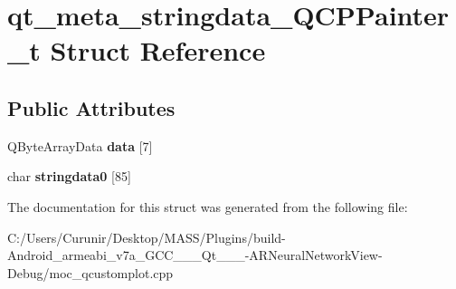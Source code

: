 \hypertarget{structqt__meta__stringdata___q_c_p_painter__t}{}\section{qt\+\_\+meta\+\_\+stringdata\+\_\+\+Q\+C\+P\+Painter\+\_\+t Struct Reference}
\label{structqt__meta__stringdata___q_c_p_painter__t}
\subsection*{Public Attributes}
\begin{DoxyCompactItemize}
\item 
\mbox{\label{structqt__meta__stringdata___q_c_p_painter__t_ac7af80f452433712c3aec1462ac4c4f7}} 
Q\+Byte\+Array\+Data {\bfseries data} \mbox{[}7\mbox{]}
\item 
\mbox{\label{structqt__meta__stringdata___q_c_p_painter__t_aacbbd6a0cc866ba22ba9aa5a89dc1507}} 
char {\bfseries stringdata0} \mbox{[}85\mbox{]}
\end{DoxyCompactItemize}


The documentation for this struct was generated from the following file\+:\begin{DoxyCompactItemize}
\item 
C\+:/\+Users/\+Curunir/\+Desktop/\+M\+A\+S\+S/\+Plugins/build-\/\+Android\+\_\+armeabi\+\_\+v7a\+\_\+\+G\+C\+C\+\_\+\_\+\_\+\+Qt\+\_\+\_\+\_-\/\+A\+R\+Neural\+Network\+View-\/\+Debug/moc\+\_\+qcustomplot.\+cpp\end{DoxyCompactItemize}
